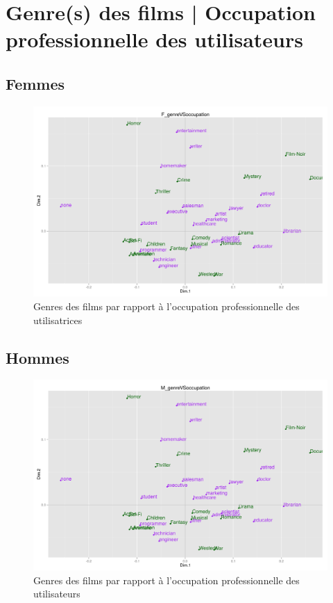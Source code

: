 \section{Genre(s) des films | Occupation professionnelle des utilisateurs}
\subsection{Femmes}
\begin{figure}[htd]
\centering
\includegraphics[scale=0.4]{./images/F_genreVSoccupation}
\caption{Genres des films par rapport à l'occupation professionnelle des utilisatrices}
\end{figure}

\subsection{Hommes}
\begin{figure}[htd]
\centering
\includegraphics[scale=0.4]{./images/M_genreVSoccupation}
\caption{Genres des films par rapport à l'occupation professionnelle des utilisateurs}
\end{figure}


